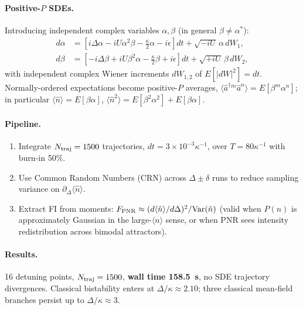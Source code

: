 \documentclass[11pt]{article}
\begin{document}
\paragraph{Positive-$P$ SDEs.}  Introducing independent complex
variables $\alpha,\beta$ (in general $\beta\neq\alpha^*$):
\begin{align}
  d\alpha &= \left[i\Delta\alpha - i U\alpha^2\beta - \tfrac{\kappa}{2}\alpha
    - i\epsilon\right]dt + \sqrt{-iU}\,\alpha\,dW_1,\\
  d\beta  &= \left[-i\Delta\beta + i U\beta^2\alpha - \tfrac{\kappa}{2}\beta
    + i\epsilon\right]dt + \sqrt{+iU}\,\beta\,dW_2,
\end{align}
with independent complex Wiener increments $dW_{1,2}$ of
$E[|dW|^2]=dt$.  Normally-ordered expectations become positive-$P$
averages, $\langle\hat a^\dag{}^m\hat a^n\rangle = E[\beta^m\alpha^n]$;
in particular $\langle\hat n\rangle = E[\beta\alpha]$,
$\langle\hat n^2\rangle = E[\beta^2\alpha^2] + E[\beta\alpha]$.

\paragraph{Pipeline.}
\begin{enumerate}\itemsep0em
\item Integrate $N_{\rm traj}=1500$ trajectories, $dt=3{\times}10^{-3}\kappa^{-1}$,
      over $T=80\kappa^{-1}$ with burn-in 50\%.
\item Use Common Random Numbers (CRN) across
      $\Delta \pm \delta$ runs to reduce sampling variance on
      $\partial_\Delta \langle\hat n\rangle$.
\item Extract FI from moments:
      $F_{\rm PNR} \approx (d\langle\hat n\rangle/d\Delta)^2/\mathrm{Var}(\hat n)$
      (valid when $P(n)$ is approximately Gaussian in the large-$\langle n\rangle$
      sense, or when PNR sees intensity redistribution across bimodal
      attractors).
\end{enumerate}

\paragraph{Results.}  16 detuning points, $N_{\rm traj}=1500$,
\textbf{wall time 158.5~s}, no SDE trajectory divergences.  Classical
bistability enters at $\Delta/\kappa\approx 2.10$; three classical
mean-field branches persist up to $\Delta/\kappa\approx 3$.
\end{document}
